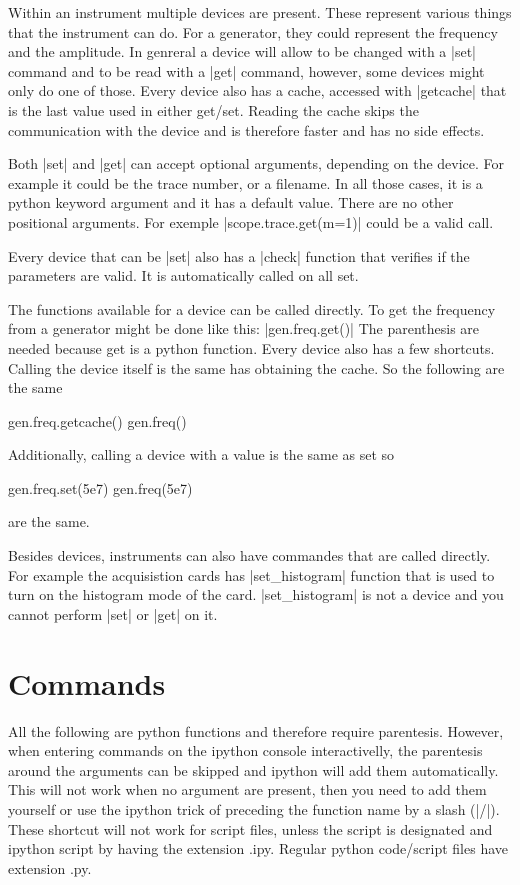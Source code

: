 \documentclass[letterpaper,12pt]{article}
\begin{document}
Within an instrument multiple devices are present. These represent various
things that the instrument can do. For a generator, they could represent the
frequency and the amplitude. In genreral a device will allow to be changed with
a |set| command and to be read with a |get| command, however, some devices might
only do one of those. Every device also has a cache, accessed with |getcache|
that is the last value used in either get/set. Reading the cache skips
the communication with the device and is therefore faster and has no side effects.

Both |set| and |get| can accept optional arguments, depending on the device.
For example it could be the trace number, or a filename. In all those cases,
it is a python keyword argument and it has a default value. There are no 
other positional arguments. For exemple |scope.trace.get(m=1)| could be
a valid call.

Every device that can be |set| also has a |check| function that verifies
if the parameters are valid. It is automatically called on all set.

The functions available for a device can be called directly. To get the frequency from a generator might be done like this: |gen.freq.get()|
The parenthesis are needed because get is a python function.
Every device also has a few shortcuts. Calling the device itself is the
same has obtaining the cache. So the following are the same
\begin{code}
gen.freq.getcache()
gen.freq()
\end{code}
Additionally, calling a device with a value is the same as set so
\begin{code}
gen.freq.set(5e7)
gen.freq(5e7)
\end{code}
are the same.

Besides devices, instruments can also have commandes that are called directly.
For example the acquisistion cards has |set_histogram| function that is used
to turn on the histogram mode of the card. |set_histogram| is not a device and
you cannot perform |set| or |get| on it.

\section{Commands}
All the following are python functions and therefore require parentesis.
However, when entering commands on the ipython console interactivelly, the
parentesis around the arguments can be skipped and ipython will add them 
automatically. This will not work when no argument are present, then you
need to add them yourself or use the ipython trick of preceding the function
name by a slash (|/|). These shortcut will not work for script files,
unless the script is designated and ipython script by having the extension
.ipy. Regular python code/script files have extension .py.
\end{document}

